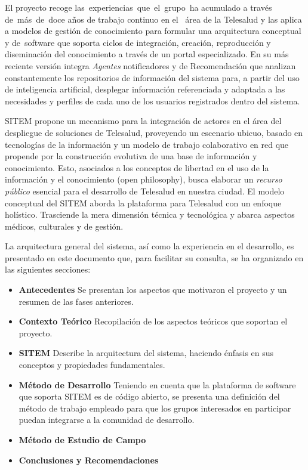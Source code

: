 El proyecto recoge las experiencias que el grupo ha acumulado a través de más de doce años de trabajo continuo en el  área de la Telesalud y las aplica a modelos de gestión de conocimiento para formular una arquitectura conceptual y de software que soporta ciclos de integración, creación, reproducción y diseminación del conocimiento a través de un portal especializado.  En su más reciente versión integra \textit{Agentes} notificadores y de Recomendación que analizan constantemente los repositorios de información del sistema para, a partir del uso de inteligencia artificial, desplegar información referenciada y adaptada a las necesidades y perfiles de cada uno de los usuarios registrados dentro del sistema.

SITEM propone un mecanismo para la integración de actores en el área del despliegue de soluciones de Telesalud, proveyendo un escenario ubicuo, basado en tecnologías de la información y un modelo de trabajo colaborativo en red que propende por la construcción evolutiva de una base de información y conocimiento. Esto, asociados a los conceptos de libertad en el uso de la información y el conocimiento (open philosophy), busca elaborar un \textit{recurso público} esencial para el desarrollo de Telesalud en nuestra ciudad. El modelo conceptual del SITEM aborda la plataforma para Telesalud con un enfoque holístico. Trasciende la mera dimensión técnica y tecnológica y abarca aspectos médicos, culturales y de gestión. 

La arquitectura general del sistema, así como la experiencia en el desarrollo, es presentado en este documento que, para facilitar su consulta, se ha organizado en las siguientes secciones:

\begin{itemize}
 \item \textbf{Antecedentes} Se presentan los aspectos que motivaron el proyecto y un resumen de las fases anteriores.
 \item \textbf{Contexto Teórico} Recopilación de los aspectos teóricos que soportan el proyecto. 
 \item \textbf{SITEM} Describe la arquitectura del sistema, haciendo énfasis en sus conceptos y propiedades fundamentales.
 \item \textbf{Método de Desarrollo} Teniendo en cuenta que la plataforma de software que soporta SITEM es de código abierto, se presenta una definición del método de trabajo empleado para que los grupos interesados en participar puedan integrarse a la comunidad de desarrollo.
 \item \textbf{Método de Estudio de Campo}
 \item \textbf{Conclusiones y Recomendaciones}
\end{itemize}



